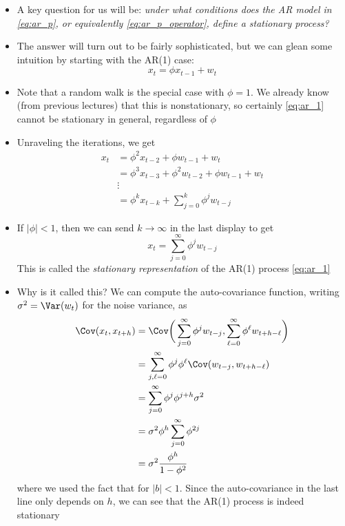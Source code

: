 \documentclass{article}
\begin{document}
\begin{itemize}
\item A key question for us will be: \emph{under what conditions does the AR
    model  in \eqref{eq:ar_p}, or equivalently \eqref{eq:ar_p_operator}, define
    a stationary process?} 

\item The answer will turn out to be fairly sophisticated, but we can glean some
  intuition by starting with the AR(1) case: 
  \begin{equation}
  \label{eq:ar_1}
  x_t = \phi x_{t-1} + w_t 
  \end{equation}

\item Note that a random walk is the special case with $\phi = 1$. We already
  know (from previous lectures) that this is nonstationary, so certainly
  \eqref{eq:ar_1} cannot be stationary in general, regardless of $\phi$ 

\item Unraveling the iterations, we get
  \begin{align*}
  x_t &= \phi^2 x_{t-2} + \phi w_{t-1} + w_t \\
  &= \phi^3 x_{t-3} + \phi^2 w_{t-2} + \phi w_{t-1} + w_t \\  
  &\vdots \\ 
  &= \phi^k x_{t-k} + \sum_{j=0}^k \phi^j w_{t-j} 
  \end{align*}

\item If $|\phi| < 1$, then we can send $k \to \infty$ in the last display to 
  get 
  \begin{equation}
  \label{eq:ar_1_stationary}
  x_t = \sum_{j=0}^\infty \phi^j w_{t-j} 
  \end{equation}
  This is called the \emph{stationary representation} of the AR(1) process
  \eqref{eq:ar_1} 

\item Why is it called this? We can compute the auto-covariance function,
  writing $\sigma^2 = \Var(w_t)$ for the noise variance, as
  \begin{align}
  \nonumber
  \Cov(x_t, x_{t+h}) &= \Cov\bigg( \sum_{j=0}^\infty \phi^j w_{t-j}, 
  \sum_{\ell=0}^\infty \phi^\ell w_{t+h-\ell} \bigg) \\
  \nonumber
  &= \sum_{j,\ell=0}^\infty \phi^j \phi^\ell \Cov( w_{t-j}, w_{t+h-\ell} ) \\ 
  \nonumber
  &= \sum_{j=0}^\infty \phi^j \phi^{j+h} \sigma^2 \\
  \nonumber
  &= \sigma^2 \phi^h \sum_{j=0}^\infty \phi^{2j} \\
  \label{eq:ar_1_auto_cov}
  &= \sigma^2 \frac{\phi^h}{1 - \phi^2}    
  \end{align}
  where we used the fact that  for $|b|
  < 1$. Since the auto-covariance in the last line only depends on $h$, we can
  see that the AR(1) process is indeed stationary


\end{itemize}
\end{document}
